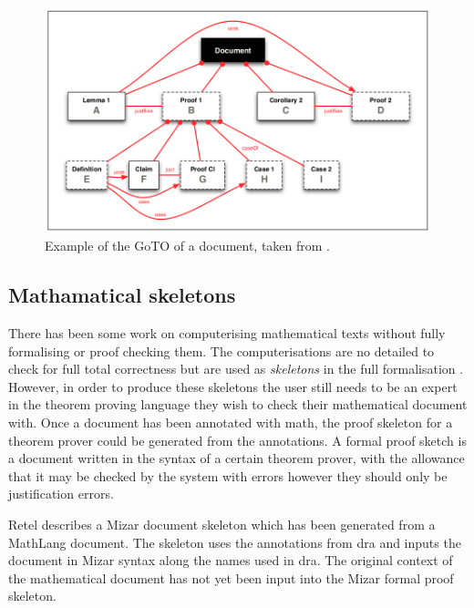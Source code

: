 \begin{figure}[H]
\begin{center}
\includegraphics[scale=0.45]{Figures/Background/pygograph.png}
\end{center}
\caption{Example of the GoTO of a document, taken from \cite{zengfirstyear}. \label{fig:pygograph}}
\end{figure}

\subsection{Mathamatical skeletons}

There has been some work on computerising mathematical texts without fully formalising or proof checking them. The computerisations are no detailed to check for full total correctness but are used as \emph{skeletons} in the full formalisation \cite{Wiedijk02formalproof}.
However, in order to produce these skeletons the user still  needs to be an expert in the theorem proving language they wish to check their mathematical document with.
Once a document has been annotated with \gls{math}, the proof skeleton for a theorem prover could be generated from the annotations. A formal proof sketch is a document written in the syntax of a certain theorem prover, with the allowance that it may be checked by the system with errors however they should only be justification errors.

Retel \cite{krzysztofphd} describes a Mizar document skeleton which has been generated from a MathLang document. The skeleton uses the annotations from \gls{dra} and inputs the document in Mizar syntax along the names used in \gls{dra}. The original context of the mathematical document has not yet been input into the Mizar formal proof skeleton.


